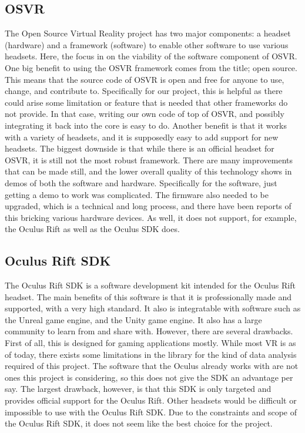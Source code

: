 \documentclass{article}
\begin{document}
\subsection{OSVR}
The Open Source Virtual Reality project has two major components: a headset (hardware) and a framework (software) to enable
other software to use various headsets. Here, the focus in on the viability of the software component of OSVR. 
One big benefit to using the OSVR framework comes from the title; open source. This means that the source code
of OSVR is open and free for anyone to use, change, and contribute to. Specifically for our project, this is helpful
as there could arise some limitation or feature that is needed that other frameworks do not provide. In that case,
writing our own code of top of OSVR, and possibly integrating it back into the core is easy to do. Another benefit
is that it works with a variety of headsets, and it is supposedly easy to add support for new headsets.
The biggest downside is that while there is an official headset for OSVR, it is still not the most robust framework.
There are many improvements that can be made still, and the lower overall quality of this technology shows in demos
of both the software and hardware. Specifically for the software, just getting a demo to work was complicated. The firmware
also needed to be upgraded, which is a technical and long process, and there have been reports of this bricking various
hardware devices. As well, it does not support, for example, the Oculus Rift as well as the Oculus SDK does.

\subsection{Oculus Rift SDK} 

The Oculus Rift SDK is a software development kit intended for the Oculus Rift headset.
The main benefits of this software is that it is professionally made and supported, with
a very high standard. It also is integratable with software such as the Unreal game engine,
and the Unity game engine. It also has a large community to learn from and share with. However,
there are several drawbacks. First of all, this is designed for gaming applications mostly. While most
VR is as of today, there exists some limitations in the library for the kind of data analysis required of
this project. The software that the Oculus already works with are not ones this project is considering,
so this does not give the SDK an advantage per say. The largest drawback, however, 
is that this SDK is only targeted and provides official support for the Oculus Rift. 
Other headsets would be difficult or impossible to use with the Oculus Rift SDK.
Due to the constraints and scope of the Oculus Rift SDK, it does not seem like the best choice for the
project. 
\end{document}
